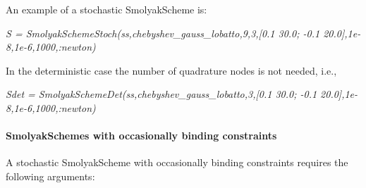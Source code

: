 \documentclass[notitlepage,11pt]{article}
\begin{document}
An example of a stochastic SmolyakScheme is:

\bigskip

\textit{S = SmolyakSchemeStoch(ss,chebyshev\_gauss\_lobatto,9,3,[0.1 30.0;
-0.1 20.0],1e-8,1e-6,1000,:newton)}

\bigskip

In the deterministic case the number of quadrature nodes is not needed, i.e.,

\bigskip

\textit{Sdet = SmolyakSchemeDet(ss,chebyshev\_gauss\_lobatto,3,[0.1 30.0;
-0.1 20.0],1e-8,1e-6,1000,:newton)}

\paragraph{SmolyakSchemes with occasionally binding constraints}

A stochastic SmolyakScheme with occasionally binding constraints requires
the following arguments:
\end{document}
